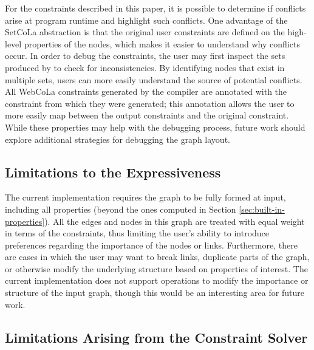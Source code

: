 For the constraints described in this paper, it is possible to determine if
conflicts arise at program runtime and highlight such conflicts. One
advantage of the SetCoLa abstraction is that the original user constraints
are defined on the high-level properties of the nodes, which makes it easier to understand why conflicts occur.
In order to debug the constraints, the user may first inspect the sets produced
by \projectname to check for inconsistencies. By identifying
nodes that exist in multiple sets, users can more easily understand the source
of potential conflicts. All WebCoLa constraints generated by the \projectname 
compiler are annotated with the \projectname constraint from which they were generated;
this annotation allows the user to more easily map between the output constraints 
and the original \projectname constraint. While these properties
may help with the debugging process, future work should explore additional
strategies for debugging the graph layout.

\vspace{-7px}
\subsection{Limitations to the Expressiveness}
The current \projectname implementation requires the graph to be fully formed
at input, including all properties (beyond the ones computed in Section 
\ref{sec:built-in-properties}). All the edges and nodes in this graph are
treated with equal weight in terms of the constraints, thus limiting the user's
ability to introduce preferences regarding the importance of the nodes or links. 
Furthermore, there are cases in which the user may want to break links, duplicate parts of 
the graph, or otherwise modify the underlying structure based on properties of interest.
The current \projectname implementation does not support operations to modify the
importance or structure of the input graph, though this would be an interesting
area for future work.  

\vspace{-7px}
\subsection{Limitations Arising from the Constraint Solver}


